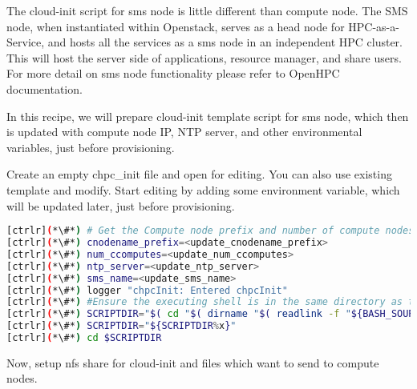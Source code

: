 	The cloud-init script for sms node is little different than compute node. The SMS node, when instantiated within Openstack, serves as a head node for HPC-as-a-Service, and hosts all the services as a sms node in an independent HPC cluster. This will host the server side of applications, resource manager, and share users. For more detail on sms node functionality please refer to OpenHPC documentation.

	In this recipe, we will prepare cloud-init template script for sms node, which then is updated with compute node IP, NTP server, and other environmental variables, just before provisioning. 

	Create an empty chpc\_init file and open for editing. You can also use existing template and modify. Start editing by adding some environment variable, which will be updated later, just before provisioning.



\begin{lstlisting}[language=bash,keywords={}]
[ctrlr](*\#*) # Get the Compute node prefix and number of compute nodes
[ctrlr](*\#*) cnodename_prefix=<update_cnodename_prefix>
[ctrlr](*\#*) num_ccomputes=<update_num_ccomputes>
[ctrlr](*\#*) ntp_server=<update_ntp_server>
[ctrlr](*\#*) sms_name=<update_sms_name>
[ctrlr](*\#*) logger "chpcInit: Entered chpcInit"
[ctrlr](*\#*) #Ensure the executing shell is in the same directory as the script.
[ctrlr](*\#*) SCRIPTDIR="$( cd "$( dirname "$( readlink -f "${BASH_SOURCE[0]}" )" )" && pwd -P && echo x)"
[ctrlr](*\#*) SCRIPTDIR="${SCRIPTDIR%x}"
[ctrlr](*\#*) cd $SCRIPTDIR

\end{lstlisting} 

	Now, setup nfs share for cloud-init and files which want to send to compute nodes.


